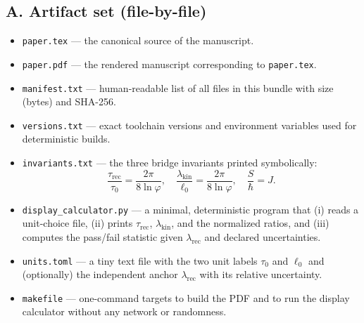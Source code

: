 \documentclass[11pt]{article}
\theoremstyle{plain}
\theoremstyle{definition}
\theoremstyle{remark}
\begin{document}
\subsection*{A. Artifact set (file-by-file)}
\begin{itemize}
  \item \texttt{paper.tex} — the canonical source of the manuscript.
  \item \texttt{paper.pdf} — the rendered manuscript corresponding to \texttt{paper.tex}.
  \item \texttt{manifest.txt} — human-readable list of all files in this bundle with size (bytes) and SHA-256.
  \item \texttt{versions.txt} — exact toolchain versions and environment variables used for deterministic builds.
  \item \texttt{invariants.txt} — the three bridge invariants printed symbolically:
  \[
  \frac{\tau_{\mathrm{rec}}}{\tau_{0}}=\frac{2\pi}{8\ln\varphi},\quad
  \frac{\lambda_{\mathrm{kin}}}{\ell_{0}}=\frac{2\pi}{8\ln\varphi},\quad
  \frac{S}{\hbar}=J.
  \]
  \item \texttt{display\_calculator.py} — a minimal, deterministic program that (i) reads a unit-choice file, (ii) prints \(\tau_{\mathrm{rec}}\), \(\lambda_{\mathrm{kin}}\), and the normalized ratios, and (iii) computes the pass/fail statistic given \(\lambda_{\mathrm{rec}}\) and declared uncertainties.
  \item \texttt{units.toml} — a tiny text file with the two unit labels \(\tau_{0}\) and \(\ell_{0}\) and (optionally) the independent anchor \(\lambda_{\mathrm{rec}}\) with its relative uncertainty.
  \item \texttt{makefile} — one-command targets to build the PDF and to run the display calculator without any network or randomness.
\end{itemize}
\end{document}
